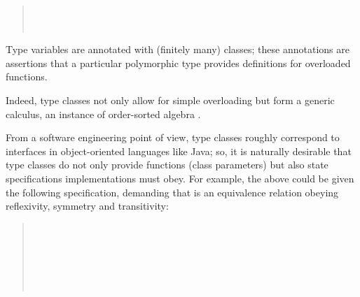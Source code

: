 \begin{isabellebody}
\begin{isamarkuptext}
\begin{quote}
  \medskip\noindent{} \\
  \hspace*{2ex} \\
  \hspace*{2ex}

  \end{quote}

  \noindent Type variables are annotated with (finitely many) classes;
  these annotations are assertions that a particular polymorphic type
  provides definitions for overloaded functions.

  Indeed, type classes not only allow for simple overloading
  but form a generic calculus, an instance of order-sorted
  algebra \cite{nipkow-sorts93,Nipkow-Prehofer:1993,Wenzel:1997:TPHOL}.

  From a software engineering point of view, type classes
  roughly correspond to interfaces in object-oriented languages like Java;
  so, it is naturally desirable that type classes do not only
  provide functions (class parameters) but also state specifications
  implementations must obey.  For example, the 
  above could be given the following specification, demanding that
   is an equivalence relation obeying reflexivity,
  symmetry and transitivity:

  \begin{quote}

  \noindent{} \\
  \hspace*{2ex} \\
   \\
  \hspace*{2ex} \\
  \hspace*{2ex} \\
  \hspace*{2ex}

  \end{quote}


\end{isamarkuptext}
\end{isabellebody}
